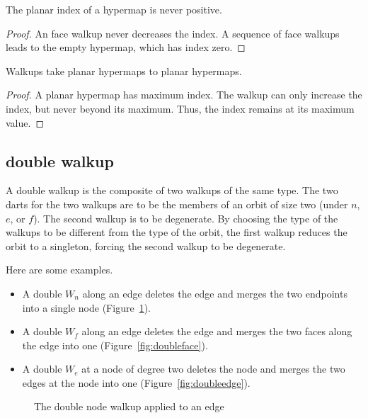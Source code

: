 \begin{lemma}  
The planar index
of a hypermap is never positive.
\end{lemma}

\begin{proof}  An face walkup never decreases the index.  A sequence
of face walkups leads to the empty hypermap, which has
index zero.
\end{proof}


\begin{lemma}
Walkups take planar hypermaps to planar
hypermaps.
\end{lemma}

\begin{proof}  
A planar hypermap has maximum index.  The walkup
can only increase the index, but never beyond its maximum.  
Thus, the index remains at its maximum value.
\end{proof}


\subsection{double walkup}

A double walkup is the composite of two walkups of the same type.  The two darts for the two walkups  are to be the members of an orbit of size two (under $n$, $e$, or $f$).  
The second walkup is to be degenerate. By choosing the type of the walkups to be different from the type of the orbit, the first walkup reduces the orbit to a singleton, forcing the second walkup to be degenerate. 
 
Here are some examples.
\begin{itemize}
    \item A double $W_n$ along an edge deletes the edge and 
   merges the two endpoints into
    a single node (Figure~\ref{fig:doublenode}). 
    \item A double $W_f$ along an edge 
    deletes the edge and merges the two faces along the edge into
    one (Figure~\ref{fig:doubleface}).
    \item A double $W_e$ at a node of degree two
    deletes the node and merges the two edges at the node into
    one (Figure~\ref{fig:doubleedge}).
\end{itemize}


\begin{figure}[htb]
  \centering
  \caption{The double node walkup applied to an edge}
  \label{fig:doublenode}
\end{figure}


